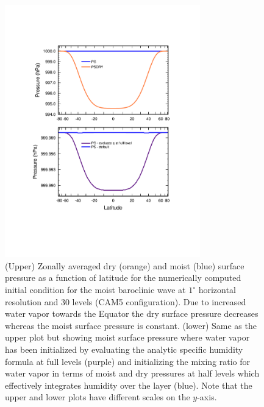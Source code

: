 \documentclass{agujournal}
\begin{document}
\begin{figure}[h]
\centering
\includegraphics[width=20pc]{figs/01_baro_init.pdf}
\caption{(Upper) Zonally averaged dry (orange) and moist (blue) surface pressure as a function of latitude for the numerically computed initial condition for the moist baroclinic wave at $1^{\circ}$ horizontal resolution and 30 levels (CAM5 configuration). Due to increased water vapor towards the Equator the dry surface pressure decreases whereas the moist surface pressure is constant. (lower) Same as the upper plot but showing moist surface pressure where water vapor has been initialized by evaluating the analytic specific humidity formula at full levels (purple) and initializing the mixing ratio for water vapor in terms of moist and dry pressures at half levels which effectively integrates humidity over the layer (blue). Note that the upper and lower plots have different scales on the $y$-axis.}
\label{fig:baro_init}
\end{figure}
\end{document}
